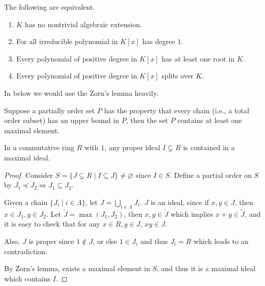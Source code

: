 \begin{prop}
  The following are equivalent.
  \begin{enumerate}
    \item $K$ has no nontrivial algebraic extension.
    \item For all irreducible polynomial in $K[x]$ has degree $1$.
    \item Every polynomial of  positive degree in $K[x]$ has at least one root in $K$.
    \item Every polynomial of  positive degree in $K[x]$ splits over $K$.
  \end{enumerate}
\end{prop}

In below we would use the Zorn's lemma heavily.
\begin{lemma}
  Suppose a partially order set $P$ has the property that every chain (i.e., a total order subset)
  has an upper bound in $P$, then the set $P$ contains at least one maximal element.
\end{lemma}

\begin{lemma} \label{lemma:max-ideal-exists}
  In a commutative ring $R$ with $1$, any proper ideal $I \subsetneq R$ is contained in a maximal ideal.

  \begin{proof}
    Consider $S = \{ J \subsetneq R \mid I \subseteq J \} \neq \varnothing$ since $I \in S$.
    Define a partial order on $S$ by $J_1 \preceq J_2 \iff J_1 \subseteq J_2$.

    Given a chain $\{ J_i \mid i \in \Lambda \}$, let $J = \bigcup_{i \in \Lambda} J_i$. $J$ is an
    ideal, since if $x, y \in J$, then $x \in J_1, y \in J_2$.
    Let $\tilde{J} = \max(J_1, J_2)$, then $x, y \in \tilde{J}$
    which implies $x + y \in \tilde{J}$, and it is easy to check that for any $x \in R, y \in J$, $xy \in J$.

    Also, $J$ is proper since $1 \not\in J$, or else $1 \in J_i$ and thus $J_i = R$ which leads to
    an contradiction.

    By Zorn's lemma, exists a maximal element in $S$, and thus it is a maximal ideal which contains $I$.
  \end{proof}
\end{lemma}

